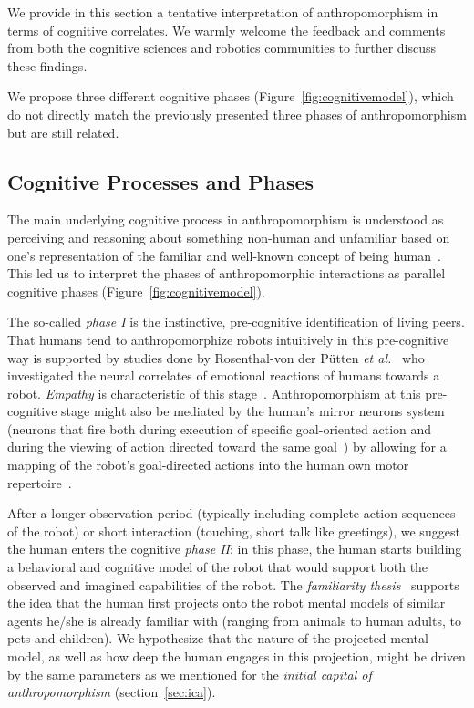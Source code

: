 \documentclass{frontiersSCNS} %
\begin{document}
We provide in this section a tentative interpretation of anthropomorphism in
terms of cognitive correlates. We warmly welcome the feedback and
comments from both the cognitive sciences and robotics communities to further
discuss these findings.

We propose three different cognitive phases (Figure~\ref{fig:cognitivemodel}),
which do not directly match the previously presented three phases of
anthropomorphism but are still related.


\subsection{Cognitive Processes and Phases}

The main underlying cognitive process in anthropomorphism is understood as
perceiving and reasoning about something non-human and unfamiliar based on one's
representation of the familiar and well-known concept of being
human~\cite{epley_when_2008}. This led us to interpret the phases of
anthropomorphic interactions as parallel cognitive phases
(Figure~\ref{fig:cognitivemodel}).

The so-called \emph{phase I} is the instinctive, pre-cognitive identification of
living peers. That humans tend to anthropomorphize robots intuitively in this
pre-cognitive way
is supported by studies done by Rosenthal-von der Pütten
\textit{et al.}~\cite{rosenthal-vonderputten_experimental_2013} who investigated
the neural correlates of emotional reactions of humans towards a robot. {\it
Empathy} is characteristic of this stage~\cite{rosenthalvonderPutten2013neural}.
Anthropomorphism at this pre-cognitive stage might also be mediated by the
human's mirror neurons system (neurons that fire both during execution of
specific goal-oriented action and during the viewing of action directed toward
the same goal~\cite{Rizzolatti1996, Kilner2009}) by allowing for a mapping of
the robot's goal-directed actions into the human own motor
repertoire~\cite{Gallese1998, Wolpert2003, cullen2013individual}.

After a longer observation period (typically including complete action sequences
of the robot) or short interaction (touching, short talk like greetings), we
suggest the human enters the cognitive \emph{phase II}: in this phase, the human
starts building a behavioral and cognitive model of the robot that would support
both the observed and imagined capabilities of the robot.  The \emph{familiarity
thesis}~\cite{hegel_understanding_2008} supports the idea that the human
first projects onto the robot mental models of similar agents he/she is already
familiar with (ranging from animals to human adults, to pets and children). We 
hypothesize that the nature of the projected mental
model, as well as how deep the human engages in this projection, might be
driven by the same parameters as we mentioned for the \emph{initial capital of
anthropomorphism} (section~\ref{sec:ica}).
\end{document}

